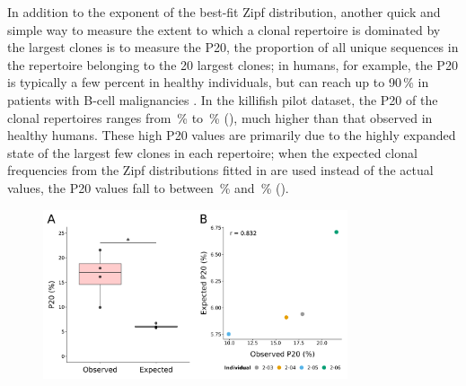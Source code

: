 In addition to the exponent of the best-fit Zipf distribution, another quick and simple way to measure the extent to which a clonal repertoire is dominated by the largest clones is to measure the P20, the proportion of all unique sequences in the repertoire belonging to the 20 largest clones; in humans, for example, the P20 is typically a few percent in healthy individuals, but can reach up to 90\,\% in patients with B-cell malignancies \parencite{rosenfeld2018clonesize}. In the killifish pilot dataset, the P20 of the clonal repertoires ranges from \,\% to \,\% (), much higher than that observed in healthy humans. These high P20 values are primarily due to the highly expanded state of the largest few clones in each repertoire; when the expected clonal frequencies from the Zipf distributions fitted in  are used instead of the actual values, the P20 values fall to between \,\% and \,\% ().

\begin{figure}
\centering
\includegraphics[width=0.8\textwidth]{_Figures/png/pilot-clones-zipf-p20-obs-exp}
\label{fig:igseq-pilot-clones-zipf-p20}
\end{figure}

